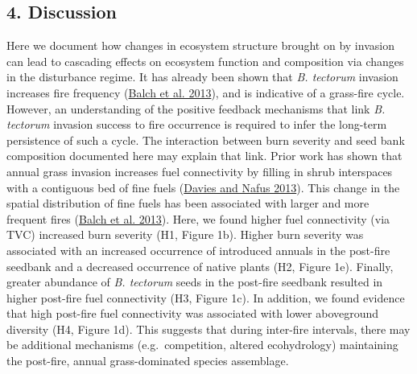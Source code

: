 \documentclass[
  12pt,
]{article}
\begin{document}
\hypertarget{discussion}{%
\subsection{4. Discussion}\label{discussion}}

Here we document how changes in ecosystem structure brought on by
invasion can lead to cascading effects on ecosystem function and
composition via changes in the disturbance regime. It has already been
shown that \emph{B. tectorum} invasion increases fire frequency
(\protect\hyperlink{ref-Balch2013}{Balch et al. 2013}), and is
indicative of a grass-fire cycle. However, an understanding of the
positive feedback mechanisms that link \emph{B. tectorum} invasion
success to fire occurrence is required to infer the long-term
persistence of such a cycle. The interaction between burn severity and
seed bank composition documented here may explain that link. Prior work
has shown that annual grass invasion increases fuel connectivity by
filling in shrub interspaces with a contiguous bed of fine fuels
(\protect\hyperlink{ref-Davies2013}{Davies and Nafus 2013}). This change
in the spatial distribution of fine fuels has been associated with
larger and more frequent fires (\protect\hyperlink{ref-Balch2013}{Balch
et al. 2013}). Here, we found higher fuel connectivity (via TVC)
increased burn severity (H1, Figure 1b). Higher burn severity was
associated with an increased occurrence of introduced annuals in the
post-fire seedbank and a decreased occurrence of native plants (H2,
Figure 1e). Finally, greater abundance of \emph{B. tectorum} seeds in
the post-fire seedbank resulted in higher post-fire fuel connectivity
(H3, Figure 1c). In addition, we found evidence that high post-fire fuel
connectivity was associated with lower aboveground diversity (H4, Figure
1d). This suggests that during inter-fire intervals, there may be
additional mechanisms (e.g.~competition, altered ecohydrology)
maintaining the post-fire, annual grass-dominated species assemblage.
\end{document}
